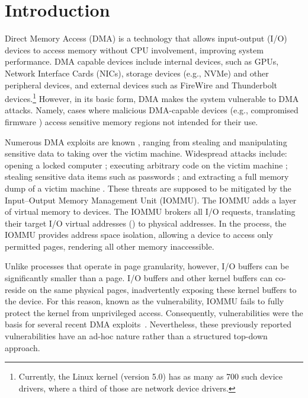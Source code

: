 \section{Introduction}

Direct Memory Access (DMA) is a technology that allows input-output (I/O) devices to access memory without CPU involvement, improving system performance.
DMA capable devices include internal devices, such as GPUs, Network Interface Cards (NICs), storage devices (e.g., NVMe) and other peripheral devices, and external devices such as FireWire and Thunderbolt devices.\footnote{Currently, the Linux kernel (version 5.0) has as many as 700 such device drivers, where a third of those are network device drivers.} However, in its basic form, DMA makes the system vulnerable to DMA attacks. Namely, cases where malicious DMA-capable devices (e.g., compromised firmware \cite{Gal14,Ben17a}) access sensitive memory regions not intended for their use. 


Numerous DMA exploits are known \cite{Dor04,BDK10,thunder}, ranging from stealing and manipulating sensitive data to taking over the victim machine. Widespread attacks include: opening a locked computer \cite{MM, Fin14}; executing arbitrary code on the victim machine \cite{Fri16, Woj08, AD10,thunder}; stealing sensitive data items such as passwords \cite{SB12, LKV13, Cim16, BR12}; and extracting a full memory dump of a victim machine \cite{MM, Vol, Fin14, GA10}. These threats are supposed to be mitigated by the Input–Output Memory Management Unit (IOMMU). The IOMMU adds a layer of virtual memory to devices. The IOMMU brokers all I/O requests, translating their target I/O virtual addresses (\DIFdelbegin {}\DIFdelend \DIFaddbegin {}\DIFaddend ) to physical addresses. In the process, the IOMMU provides address space isolation, allowing a device to access only permitted pages, rendering all other memory inaccessible.

Unlike processes that operate in page granularity, however, I/O buffers can be significantly smaller than a page. I/O buffers and other kernel buffers can co-reside on the same physical pages, inadvertently exposing these kernel buffers to the device. For this reason, known as the \subpage{} vulnerability\DIFaddbegin {}\DIFaddend , IOMMU fails to fully protect the kernel from unprivileged access. Consequently, \subpage{} vulnerabilities were the basis for several recent DMA exploits~\DIFdelbegin {}\DIFdelend \DIFaddbegin {}\DIFaddend .
Nevertheless, these previously reported vulnerabilities have an ad-hoc nature rather than a structured top-down approach. 

